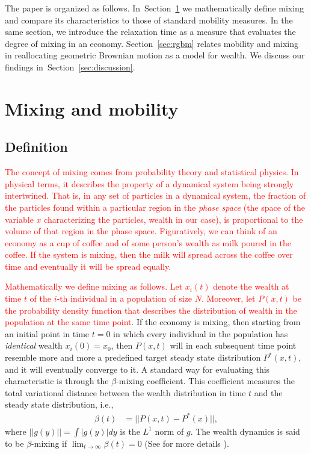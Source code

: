\documentclass[11pt]{article}
\newcommand{\blue}[1]{{\color{blue} #1}}
\newcommand{\Sref}[1]{Section~\ref{sec:#1}}
\newcommand{\YB}[1]{\blue{{\it YB: #1 YB}}}
\numberwithin{equation}{section}
\begin{document}
The paper is organized as follows. In~\Sref{mixing-time} we mathematically define mixing and compare its characteristics to those of standard mobility measures. In the same section, we introduce the relaxation time as a measure that evaluates the degree of mixing in an economy. \Sref{rgbm} relates mobility and mixing in reallocating geometric Brownian motion as a model for wealth. We discuss our findings in~\Sref{discussion}.

\section{Mixing and mobility}
\label{sec:mixing-time}

\subsection{Definition}


\textcolor{red}{The concept of mixing comes from probability theory and statistical physics. In physical terms, it describes the property of a dynamical system being strongly intertwined. That is, in any set of particles in a dynamical system, the fraction of the particles found within a particular region in the \textit{phase space} (the space of the variable $x$ characterizing the particles, wealth in our case), is proportional to the volume of that region in the phase space. Figuratively, we can think of an economy as a cup of coffee and of some person's wealth as milk poured in the coffee. If the system is mixing, then the milk will spread across the coffee over time  and eventually it will be spread equally.}
 
\textcolor{red}{Mathematically we define mixing as follows. Let $x_i(t)$ denote the wealth at time $t$ of the $i$-th individual in a population of size $N$. Moreover, let $P(x,t)$ be the probability density function that describes the distribution of wealth in the population at the same time point.} If the economy is mixing, then starting from an initial point in time $t = 0$ in which every individual in the population has \textit{identical} wealth $x_i(0) = x_0$, then $P(x,t)$ will in each subsequent time point resemble more and more a predefined target steady state distribution $P^*(x,t)$, and it will eventually converge to it. A standard way for evaluating this characteristic is through the $\beta$-mixing coefficient. This coefficient measures the total variational distance between the wealth distribution in time $t$ and the steady state distribution, i.e.,
\begin{align*}
    \beta(t) &= || P(x,t) - P^*(x) ||,
\end{align*}
where $||g(y)|| = \int |g(y)| dy$ is the $L^1$ norm of $g$. The wealth dynamics is said to be $\beta$-mixing if $\lim_{t \to\infty} \beta(t) = 0$ (See for more details \citep{drees2000weighted}). %
\end{document}
